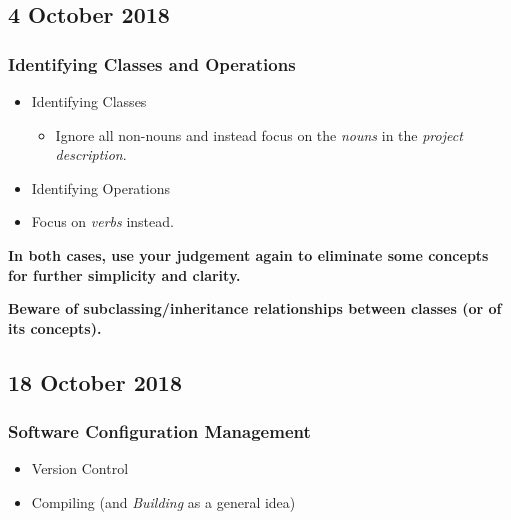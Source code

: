 \documentclass[a4paper]{article}
\providecommand{\tightlist}{%
  \setlength{\itemsep}{0pt}\setlength{\parskip}{0pt}}
\begin{document}
\hypertarget{4-october-2018}{%
\subsection{4 October 2018}\label{4-october-2018}}

\hypertarget{identifying-classes-and-operations}{%
\subsubsection{Identifying Classes and
Operations}\label{identifying-classes-and-operations}}

\begin{itemize}
\item
  Identifying Classes

  \begin{itemize}
  \tightlist
  \item
    Ignore all non-nouns and instead focus on the \emph{nouns} in the
    \emph{project description}.
  \end{itemize}
\item
  Identifying Operations
\item
  Focus on \emph{verbs} instead.
\end{itemize}

\textbf{In both cases, use your judgement again to eliminate some
concepts for further simplicity and clarity.}

\textbf{Beware of subclassing/inheritance relationships between classes
(or of its concepts).}



\hypertarget{18-october-2018}{%
\subsection{18 October 2018}\label{18-october-2018}}

\hypertarget{software-configuration-management}{%
\subsubsection{Software Configuration
Management}\label{software-configuration-management}}

\begin{itemize}
\tightlist
\item
  Version Control
\item
  Compiling (and \emph{Building} as a general idea)
\end{itemize}
\end{document}
